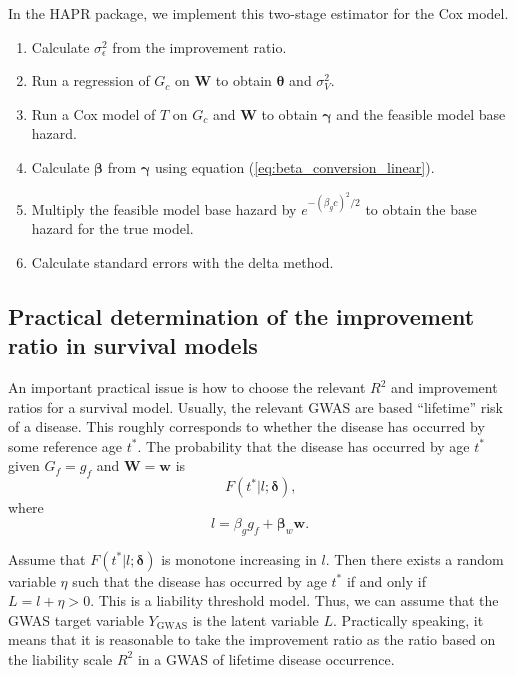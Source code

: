 \documentclass[12pt]{article}
\begin{document}
In the HAPR package, we implement this two-stage estimator for the Cox model.
\begin{enumerate}
    \item Calculate $\sigma^2_\epsilon$ from the improvement ratio.
    \item Run a regression of $G_c$ on $\boldsymbol W$ to obtain $\boldsymbol \theta$ and $\sigma^2_V$.
    \item Run a Cox model of $T$ on $G_c$ and $\boldsymbol W$ to obtain $\boldsymbol{\gamma}$ and the feasible model base hazard.
    \item Calculate $\boldsymbol{\beta}$ from $\boldsymbol{\gamma}$ using equation (\ref{eq:beta_conversion_linear}).
    \item Multiply the feasible model base hazard by $e^{-(\beta_g c)^2 / 2}$ to obtain the base hazard for the true model.
    \item Calculate standard errors with the delta method.
\end{enumerate}


\subsection{Practical determination of the improvement ratio in survival models}
An important practical issue is how to choose the relevant $R^2$ and improvement ratios for a survival model. Usually, the relevant GWAS are based ``lifetime'' risk of a disease. This roughly corresponds to whether the disease has occurred by some reference age $t^*$. The probability that the disease has occurred by age $t^*$ given $G_f = g_f$ and $\boldsymbol W = \boldsymbol w$ is
\[
    F(t^* | l ; \boldsymbol \delta)
    \text{,}
\]
where
\[
    l = \beta_g g_f + \boldsymbol{\beta}_w \boldsymbol w
    \text{.}
\]

Assume that $F(t^* | l ; \boldsymbol \delta)$ is monotone increasing in $l$. Then there exists a random variable $\eta$ such that the disease has occurred by age $t^*$ if and only if $L = l + \eta > 0$. This is a liability threshold model. Thus, we can assume that the GWAS target variable $Y_\text{GWAS}$ is the latent variable $L$. Practically speaking, it means that it is reasonable to take the improvement ratio as the ratio based on the liability scale $R^2$ in a GWAS of lifetime disease occurrence.

\printbibliography
\end{document}

